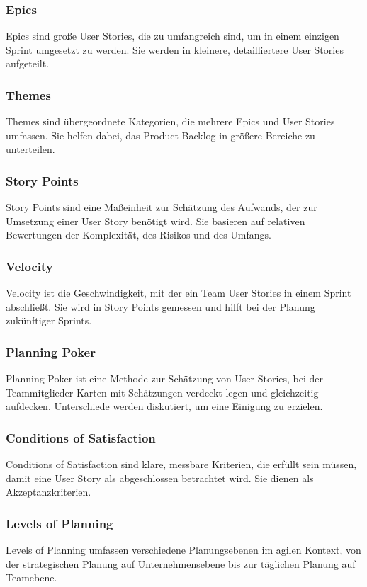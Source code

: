 \subsubsection{Epics}
Epics sind große User Stories, die zu umfangreich sind, um in einem einzigen Sprint umgesetzt zu werden. Sie werden in kleinere, detailliertere User Stories aufgeteilt.

\subsubsection{Themes}
Themes sind übergeordnete Kategorien, die mehrere Epics und User Stories umfassen. Sie helfen dabei, das Product Backlog in größere Bereiche zu unterteilen.

\subsubsection{Story Points}
Story Points sind eine Maßeinheit zur Schätzung des Aufwands, der zur Umsetzung einer User Story benötigt wird. Sie basieren auf relativen Bewertungen der Komplexität, des Risikos und des Umfangs.

\subsubsection{Velocity}
Velocity ist die Geschwindigkeit, mit der ein Team User Stories in einem Sprint abschließt. Sie wird in Story Points gemessen und hilft bei der Planung zukünftiger Sprints.

\subsubsection{Planning Poker}
Planning Poker ist eine Methode zur Schätzung von User Stories, bei der Teammitglieder Karten mit Schätzungen verdeckt legen und gleichzeitig aufdecken. Unterschiede werden diskutiert, um eine Einigung zu erzielen.

\subsubsection{Conditions of Satisfaction}
Conditions of Satisfaction sind klare, messbare Kriterien, die erfüllt sein müssen, damit eine User Story als abgeschlossen betrachtet wird. Sie dienen als Akzeptanzkriterien.

\subsubsection{Levels of Planning}
Levels of Planning umfassen verschiedene Planungsebenen im agilen Kontext, von der strategischen Planung auf Unternehmensebene bis zur täglichen Planung auf Teamebene.

